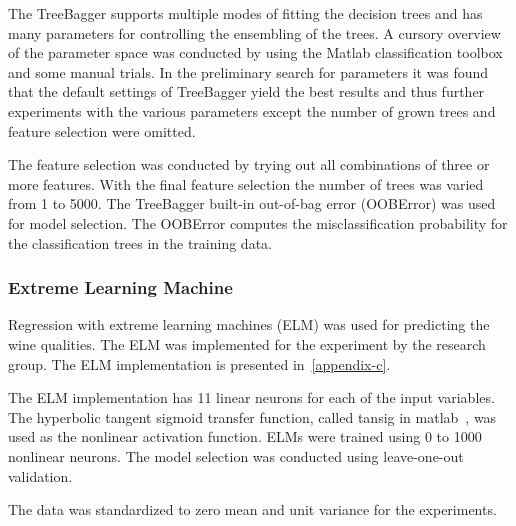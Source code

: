 The TreeBagger supports multiple modes of fitting the decision trees and has many parameters for controlling the ensembling of the trees. A cursory overview of the parameter space was conducted by using the Matlab classification toolbox and some manual trials. In the preliminary search for parameters it was found that the default settings of TreeBagger yield the best results and thus further experiments with the various parameters except the number of grown trees and feature selection were omitted.

The feature selection was conducted by trying out all combinations of three or more features. With the final feature selection the number of trees was varied from 1 to 5000. The TreeBagger built-in out-of-bag error (OOBError) was used for model selection. The OOBError computes the misclassification probability for the classification trees in the training data.

\subsubsection{Extreme Learning Machine}
Regression with extreme learning machines (ELM) was used for predicting the wine qualities. The ELM was implemented for the experiment by the research group. The ELM implementation is presented in~\ref{appendix-c}.

The ELM implementation has 11 linear neurons for each of the input variables. The hyperbolic tangent sigmoid transfer function, called tansig in matlab~\cite{matlab:2015:tansig}, was used as the nonlinear activation function. ELMs were trained using 0 to 1000 nonlinear neurons. The model selection was conducted using leave-one-out validation.

The data was standardized to zero mean and unit variance for the experiments.

